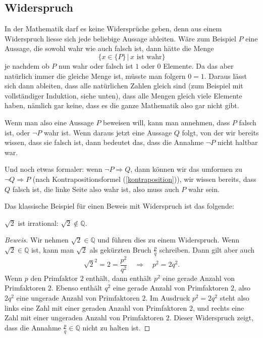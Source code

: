 \subsection{Widerspruch\label{widerspruchsbeweis}}
%
%
In der Mathematik darf es keine Widersprüche geben, denn aus einem
Widerspruch liesse sich jede beliebige Aussage ableiten.
Wäre zum
Beispiel $P$ eine Aussage, die sowohl wahr wie auch falsch ist,
dann hätte die Menge
\[
\{x\in\{P\}\,|\, \text{$x$ ist wahr}\}
\]
je nachdem ob $P$ nun wahr oder falsch ist $1$ oder $0$ Elemente.
Da das aber natürlich immer die gleiche Menge ist, müsste man
folgern $0=1$.
Daraus lässt sich dann ableiten, dass alle natürlichen
Zahlen gleich sind (zum Beispiel mit vollständiger Induktion, siehe
unten), dass alle Mengen gleich viele Elemente haben, nämlich gar
keine, dass es die ganze Mathematik also gar nicht gibt.

Wenn man also eine Aussage $P$ beweisen will, kann man annehmen,
dass $P$ falsch ist, oder $\neg P$ wahr ist.
Wenn daraus jetzt
eine Aussage $Q$ folgt, von der wir bereits wissen, dass sie falsch
ist, dann bedeutet das, dass die Annahme $\neg P$ nicht haltbar
war.

Und noch etwas formaler: wenn $\neg P\Rightarrow Q$, dann können
wir das umformen zu $\neg Q\Rightarrow P$ (nach Kontrapositionsformel
(\ref{kontraposition})), wir wissen bereits, dass
$Q$ falsch ist, die linke Seite also wahr ist, also muss auch $P$
wahr sein.

Das klassische Beispiel für einen Beweis mit Widerspruch ist das 
folgende:
\begin{satz}$\sqrt{2}$ ist irrational: $\sqrt{2}\not\in\mathbb Q$.
%
\end{satz}
\begin{proof}[Beweis]
Wir nehmen $\sqrt{2}\in\mathbb Q$ und führen dies zu einem
Widerspruch.
Wenn $\sqrt{2}\in\mathbb Q$ ist, kann man $\sqrt{2}$
als gekürzten Bruch $\frac{p}{q}$ schreiben.
Dann gilt aber
auch
\[
\sqrt{2}^2=2=\frac{p^2}{q^2}\quad\Rightarrow\quad p^2=2q^2.
\]
Wenn $p$ den Primfaktor $2$ enthält, dann enthält $p^2$
eine gerade Anzahl von Primfaktoren $2$.
Ebenso enthält
$q^2$ eine gerade Anzahl von Primfaktoren $2$, also $2q^2$
eine ungerade Anzahl von Primfaktoren $2$.
Im Ausdruck $p^2=2q^2$ steht also links eine Zahl mit einer
geraden Anzahl von Primfaktoren $2$, und rechts eine Zahl mit
einer ungeraden Anzahl von Primfaktoren $2$.
Dieser Widerspruch zeigt, dass die
Annahme $\frac{p}q\in\mathbb Q$ nicht zu halten ist.
\end{proof}

